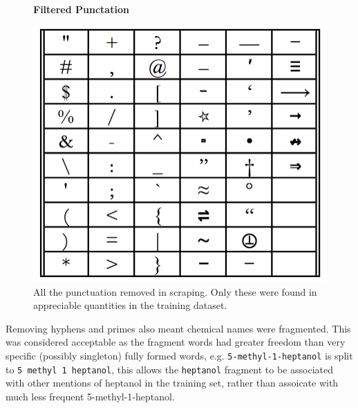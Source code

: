 \begin{figure}[H]
    \centering
    \textbf{Filtered Punctation }\par\medskip
    \includegraphics[scale=0.2]{Algorithm/punct_table.png}
    \caption{All the punctuation removed in scraping. Only these were found in appreciable quantities in the training dataset. }
     \label{fig:punct}
\end{figure}
Removing hyphens and primes also meant chemical names were fragmented. This was considered acceptable as the fragment words had greater freedom than very specific (possibly singleton) fully formed words, e.g. \texttt{5-methyl-1-heptanol} is split to \texttt{5 methyl 1 heptanol}, this allows the \texttt{heptanol} fragment to be associated with other mentions of heptanol in the training set, rather than assoicate with much less frequent 5-methyl-1-heptanol. 

